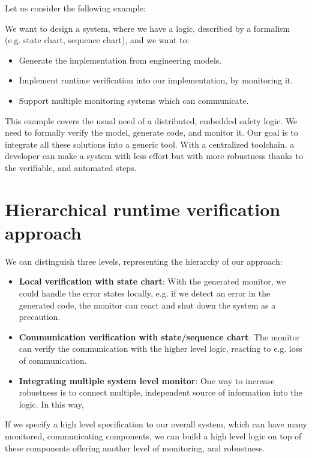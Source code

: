 \noindent Let us consider the following example:

We want to design a system, where we have a logic, described by a formalism (e.g. state chart, sequence chart), and we want to:
\begin{itemize}
	\item Generate the implementation from engineering models.
	\item Implement runtime verification into our implementation, by monitoring it.
	\item Support multiple monitoring systems which can communicate.
\end{itemize}

This example covers the usual need of a distributed, embedded safety logic. We need to formally verify the model, generate code, and monitor it. Our goal is to integrate all these solutions into a generic tool. With a centralized toolchain, a developer can make a system with less effort but with more robustness thanks to the verifiable, and automated steps.
\\[1ex]

\section{Hierarchical runtime verification approach}

We can distinguish three levels, representing the hierarchy of our approach:
\begin{itemize}
	\item \textbf{Local verification with state chart}: With the generated monitor, we could handle the error states locally, e.g. if we detect an error in the generated code, the monitor can react and shut down the system as a precaution.
	\item \textbf{Communication verification with state/sequence chart}: The monitor can verify the communication with the higher level logic, reacting to e.g. loss of communication.
	\item \textbf{Integrating multiple system level monitor}: One way to increase robustness is to connect multiple, independent source of information into the logic. In this way,  
\end{itemize}

If we specify a high level specification to our overall system, which can have many monitored, communicating components, we can build a high level logic on top of these components offering another level of monitoring, and robustness.

